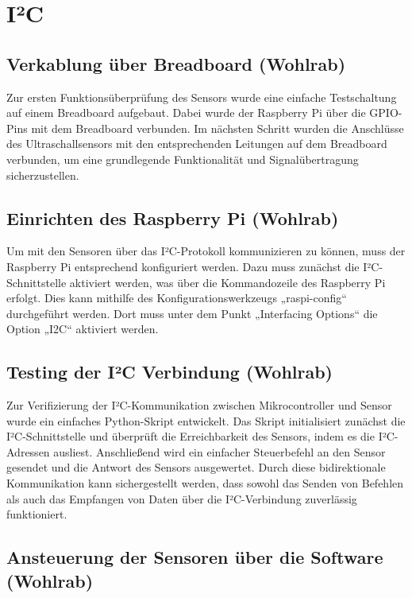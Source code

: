 \section{I²C}

\subsection{Verkablung über Breadboard (Wohlrab)}

Zur ersten Funktionsüberprüfung des Sensors wurde eine einfache Testschaltung auf einem Breadboard aufgebaut. 
Dabei wurde der Raspberry Pi über die GPIO-Pins mit dem Breadboard verbunden. 
Im nächsten Schritt wurden die Anschlüsse des Ultraschallsensors mit den entsprechenden Leitungen auf dem Breadboard verbunden, um eine grundlegende Funktionalität und Signalübertragung sicherzustellen.

\subsection{Einrichten des Raspberry Pi (Wohlrab)}

Um mit den Sensoren über das I²C-Protokoll kommunizieren zu können, muss der Raspberry Pi entsprechend konfiguriert werden. 
Dazu muss zunächst die I²C-Schnittstelle aktiviert werden, was über die Kommandozeile des Raspberry Pi erfolgt. 
Dies kann mithilfe des Konfigurationswerkzeugs „raspi-config“ durchgeführt werden. 
Dort muss unter dem Punkt „Interfacing Options“ die Option „I2C“ aktiviert werden.

\subsection{Testing der I²C Verbindung (Wohlrab)}

Zur Verifizierung der I²C-Kommunikation zwischen Mikrocontroller und Sensor wurde ein einfaches Python-Skript entwickelt. 
Das Skript initialisiert zunächst die I²C-Schnittstelle und überprüft die Erreichbarkeit des Sensors, indem es die I²C-Adressen ausliest.
Anschließend wird ein einfacher Steuerbefehl an den Sensor gesendet und die Antwort des Sensors ausgewertet. 
Durch diese bidirektionale Kommunikation kann sichergestellt werden, dass sowohl das Senden von Befehlen als auch das Empfangen von Daten über die I²C-Verbindung zuverlässig funktioniert.

\subsection{Ansteuerung der Sensoren über die Software (Wohlrab)}

